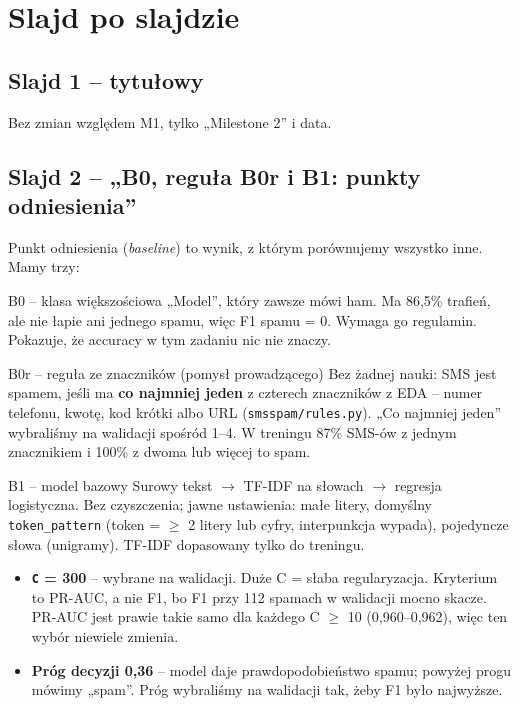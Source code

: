 \documentclass[11pt,a4paper]{article}
\begin{document}
\section{Slajd po slajdzie}

\subsection{Slajd 1 -- tytułowy}
Bez zmian względem M1, tylko „Milestone 2” i data.

\subsection{Slajd 2 -- „B0, reguła B0r i B1: punkty odniesienia”}

Punkt odniesienia (\emph{baseline}) to wynik, z którym porównujemy wszystko inne. Mamy trzy:

\begin{pojecie}{B0 -- klasa większościowa}
„Model”, który zawsze mówi ham. Ma 86,5\% trafień, ale nie łapie ani jednego spamu, więc F1 spamu = 0.
Wymaga go regulamin. Pokazuje, że accuracy w tym zadaniu nic nie znaczy.
\end{pojecie}

\begin{pojecie}{B0r -- reguła ze znaczników (pomysł prowadzącego)}
Bez żadnej nauki: SMS jest spamem, jeśli ma \textbf{co najmniej jeden} z czterech znaczników z EDA -- numer telefonu,
kwotę, kod krótki albo URL (\texttt{smsspam/rules.py}). „Co najmniej jeden” wybraliśmy na walidacji spośród 1--4.
W treningu 87\% SMS-ów z jednym znacznikiem i 100\% z dwoma lub więcej to spam.
\end{pojecie}

\begin{pojecie}{B1 -- model bazowy}
Surowy tekst $\to$ TF-IDF na słowach $\to$ regresja logistyczna. Bez czyszczenia; jawne ustawienia: małe litery, domyślny
\texttt{token\_pattern} (token = $\geq$ 2 litery lub cyfry, interpunkcja wypada), pojedyncze słowa (unigramy).
TF-IDF dopasowany tylko do treningu.
\begin{itemize}
  \item \textbf{\texttt{C} = 300} -- wybrane na walidacji. Duże C = słaba regularyzacja. Kryterium to PR-AUC, a nie F1,
        bo F1 przy 112 spamach w walidacji mocno skacze. PR-AUC jest prawie takie samo dla każdego C $\geq$ 10
        (0,960--0,962), więc ten wybór niewiele zmienia.
  \item \textbf{Próg decyzji 0,36} -- model daje prawdopodobieństwo spamu; powyżej progu mówimy „spam”. Próg wybraliśmy
        na walidacji tak, żeby F1 było najwyższe.
\end{itemize}
\end{pojecie}
\end{document}

